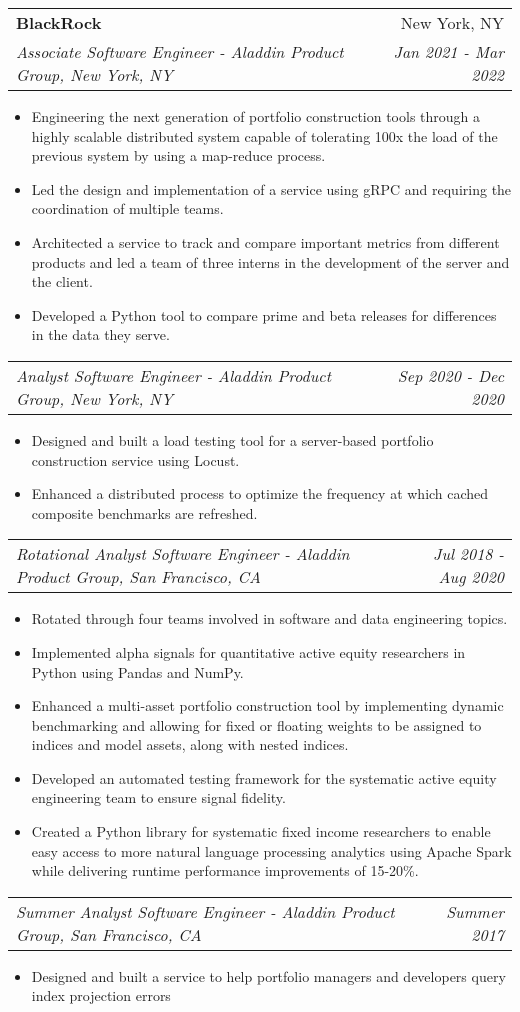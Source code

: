 \documentclass[letterpaper,10pt]{article}
\makeatletter
\newcommand{\resumeItem}[1]{
  \item\small{#1}
}
\newcommand{\resumeSubheading}[4]{
  \vspace{-1pt}\item
    \begin{tabular*}{0.97\textwidth}[t]{l@{\extracolsep{\fill}}r}
      \textbf{#1} & #2 \\
      \textit{\small#3} & \textit{\small #4} \\
    \end{tabular*}\vspace{-5pt}
}
\newcommand{\resumeSubSubheading}[2]{
    \begin{tabular*}{0.97\textwidth}{l@{\extracolsep{\fill}}r}
      \textit{\small#1} & \textit{\small #2} \\
    \end{tabular*}\vspace{-5pt}
}
\newcommand{\resumeItemListStart}{\begin{itemize}}
\newcommand{\resumeItemListEnd}{\end{itemize}\vspace{-5pt}}
\makeatother
\begin{document}
    \resumeSubheading
      {BlackRock}{New York, NY}
      {Associate Software Engineer - Aladdin Product Group, New York, NY}{Jan 2021 - Mar 2022}
      \resumeItemListStart
        \resumeItem{Engineering the next generation of portfolio construction tools through a highly scalable distributed system capable of tolerating 100x the load of the previous system by using a map-reduce process.}
        \resumeItem{Led the design and implementation of a service using gRPC and requiring the coordination of multiple teams.}
        \resumeItem{Architected a service to track and compare important metrics from different products and led a team of three interns in the development of the server and the client.}
        \resumeItem{Developed a Python tool to compare prime and beta releases for differences in the data they serve.}
      \resumeItemListEnd
      \resumeSubSubheading
      {Analyst Software Engineer - Aladdin Product Group, New York, NY}{Sep 2020 - Dec 2020}
      \resumeItemListStart
        \resumeItem{Designed and built a load testing tool for a server-based portfolio construction service using Locust.}
        \resumeItem{Enhanced a distributed process to optimize the frequency at which cached composite benchmarks are refreshed.}
      \resumeItemListEnd
      \resumeSubSubheading
      {Rotational Analyst Software Engineer - Aladdin Product Group, San Francisco, CA}{Jul 2018 - Aug 2020}
      \resumeItemListStart
        \resumeItem{Rotated through four teams involved in software and data engineering topics.}
        \resumeItem{Implemented alpha signals for quantitative active equity researchers in Python using Pandas and NumPy.}
        \resumeItem{Enhanced a multi-asset portfolio construction tool by implementing dynamic benchmarking and allowing for fixed or floating weights to be assigned to indices and model assets, along with nested indices.}
        \resumeItem{Developed an automated testing framework for the systematic active equity engineering team to ensure signal fidelity.}
        \resumeItem{Created a Python library for systematic fixed income researchers to enable easy access to more natural language processing analytics using Apache Spark while delivering runtime performance improvements of 15-20\%.}
      \resumeItemListEnd
      \resumeSubSubheading
      {Summer Analyst Software Engineer - Aladdin Product Group, San Francisco, CA}{Summer 2017}
      \resumeItemListStart
        \resumeItem{Designed and built a service to help portfolio managers and developers query index projection errors}
      \resumeItemListEnd
\end{document}
